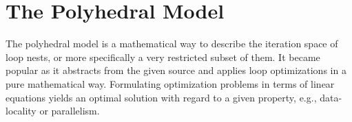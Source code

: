 \clearpage
\section{The Polyhedral Model}
The polyhedral model is a mathematical way to describe the iteration space of 
loop nests, or more specifically a very restricted subset of them.
It became popular as it abstracts from the given source and applies loop
optimizations in a pure mathematical way. Formulating optimization problems 
in terms of linear equations yields an optimal solution with regard to a given
property, e.g., data-locality or parallelism.




  


